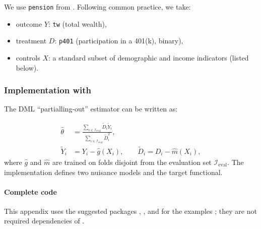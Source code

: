 We use \texttt{pension} from . Following common practice, we take:

\begin{itemize}
\tightlist
\item
  outcome \(Y\): \texttt{tw} (total wealth),
\item
  treatment \(D\): \texttt{p401} (participation in a 401(k), binary),
\item
  controls \(X\): a standard subset of demographic and income indicators (listed below).
\end{itemize}

\subsubsection{\texorpdfstring{Implementation with }{Implementation with }}\label{implementation-with}

The DML ``partialling-out'' estimator can be written as:

\begin{equation}
\begin{aligned}
\widehat{\theta}
&=
\frac{\sum_{i \in \mathcal{I}_{\mathrm{eval}}}
\widetilde{D}_i \widetilde{Y}_i}
{\sum_{i \in \mathcal{I}_{\mathrm{eval}}}
\widetilde{D}_i^2},
\\
\widetilde{Y}_i &= Y_i - \widehat{g}(X_i),\qquad
\widetilde{D}_i = D_i - \widehat{m}(X_i),
\end{aligned}
\label{eq:plr-estimator}
\end{equation}
where \(\widehat{g}\) and \(\widehat{m}\) are trained on folds disjoint from the evaluation set \(\mathcal{I}_{\mathrm{eval}}\). The implementation defines two nuisance models and the target functional.

\paragraph{Complete code}\label{complete-code}

This appendix uses the suggested packages , , and  for the examples \citep{hdm, ranger, friedman2010glmnet, tay2023glmnet}; they are not required dependencies of .

